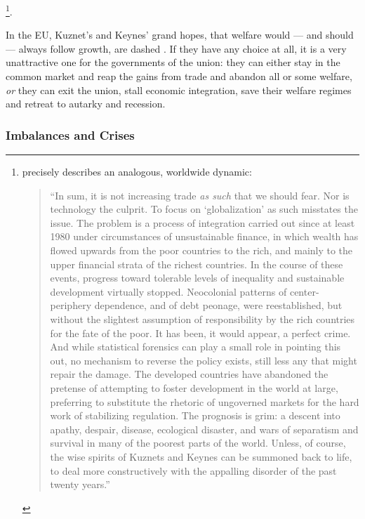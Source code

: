 \documentclass[11pt,a4paper,oneside,openright]{article}
\begin{document}
\footnote{
	\cite[25]{Galbraith2002a} precisely describes an analogous, worldwide dynamic:
	\begin{quote}
		``In sum, it is not increasing trade \emph{as such} that we should fear. 
		Nor is technology the culprit. 
		To focus on `globalization' as such misstates the issue. 
		The problem is a process of integration carried out since at least 1980 under circumstances of unsustainable finance, in which wealth has flowed upwards from the poor countries to the rich, and mainly to the upper financial strata of the richest countries. 
		In the course of these events, progress toward tolerable levels of inequality and sustainable development virtually stopped. 
		Neocolonial patterns of center-periphery dependence, and of debt peonage, were reestablished, but without the slightest assumption of responsibility by the rich countries for the fate of the poor. 
		It has been, it would appear, a perfect crime. 
		And while statistical forensics can play a small role in pointing this out, no mechanism to reverse the policy exists, still less any that might repair the damage. 
		The developed countries have abandoned the pretense of attempting to foster development in the world at large, preferring to substitute the rhetoric of ungoverned markets for the hard work of stabilizing regulation. 
		The prognosis is grim: 
		a descent into apathy, despair, disease, ecological disaster, and wars of separatism and survival in many of the poorest parts of the world. 
		Unless, of course, the wise spirits of Kuznets and Keynes can be summoned back to life, to deal more constructively with the appalling disorder of the past twenty years.''
	\end{quote}
}.

In the \gls{EU}, Kuznet's and Keynes' grand hopes, that welfare would --- and should --- always follow growth, are dashed \citep[as cited in][22]{Galbraith2002a}. 
If they have any choice at all, it is a very unattractive one for the governments of the union:
they can either stay in the common market and reap the gains from trade and abandon all or some welfare, \emph{or} they can exit the union, stall economic integration, save their welfare regimes and retreat to autarky and recession.

\subsubsection{Imbalances and Crises} 
\end{document}
